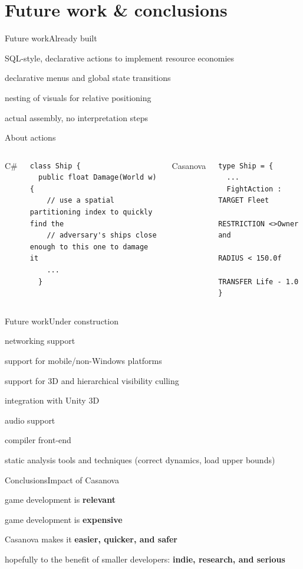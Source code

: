 \documentclass{beamer}
\begin{document}
\section{Future work \& conclusions}
\begin{slide}{Future work}{Already built}{
\item SQL-style, declarative actions to implement resource economies
\item declarative menus and global state transitions
\item nesting of visuals for relative positioning
\item actual assembly, no interpretation steps
}\end{slide}

\begin{frame}[fragile]{About actions}
\begin{columns}
\column{5cm}
\large{C\#}
\begin{lstlisting}
class Ship {
  public float Damage(World w) {
    // use a spatial partitioning index to quickly find the 
    // adversary's ships close enough to this one to damage it
    ...
  }
\end{lstlisting}
\column{5cm}
\large{Casanova}
\begin{lstlisting}
type Ship = {
  ...
  FightAction : TARGET Fleet
                RESTRICTION <>Owner and 
                RADIUS < 150.0f
                TRANSFER Life - 1.0
}
\end{lstlisting}
\end{columns}
\end{frame}

\begin{slide}{Future work}{Under construction}{
\item networking support
\item support for mobile/non-Windows platforms
\item support for 3D and hierarchical visibility culling
\item integration with Unity 3D
\item audio support
\item compiler front-end
\item static analysis tools and techniques (correct dynamics, load upper bounds)
}\end{slide}

\begin{slide}{Conclusions}{Impact of Casanova}{
\item game development is \textbf{relevant}
\item game development is \textbf{expensive}
\item Casanova makes it \textbf{easier, quicker, and safer}
\item hopefully to the benefit of smaller developers: \textbf{indie, research, and serious}
}\end{slide}
\end{document}
